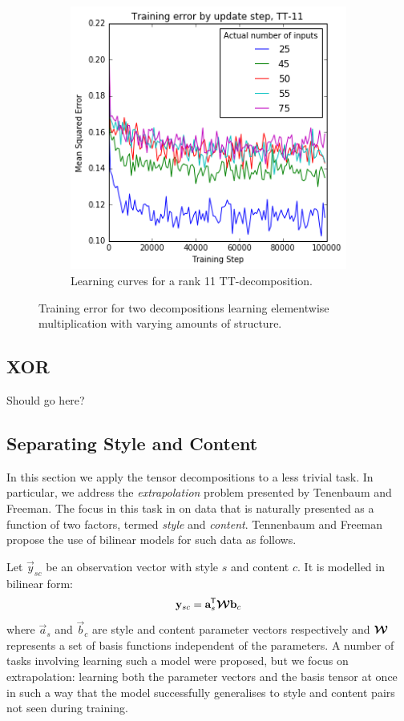 {\begin{figure}
\begin{subfigure}[t]{0.45\textwidth}
		\includegraphics[width=\textwidth]{tensors/correlatett11-mom}
		\caption{Learning curves for a rank 11 TT-decomposition.}
	\end{subfigure}
	\caption{Training error for two decompositions learning elementwise multiplication with
	 varying amounts of structure.}
	\label{fig:correlate-multiply}
\end{figure}

\subsection{XOR}
Should go here?

\subsection{Separating Style and Content}
In this section we apply the tensor decompositions to a less trivial task. In particular, we
address the \textit{extrapolation} problem presented by Tenenbaum and 
Freeman. \autocite{Tenenbaum2000} The focus in this task in on data that is naturally presented as a
function of two factors, termed \textit{style} and \textit{content}. Tennenbaum and Freeman
propose the use of bilinear models for such data as follows.

Let \(\vec{y}_{sc}\) be an observation vector with style \(s\) and content \(c\). It is modelled
in bilinear form:
\begin{equation}
	\mathbf{y}_{sc} = \mathbf{a}_s^{\mkern-1.5mu\mathsf{T}}\bm{\mathcal{W}}\mathbf{b}_c
\end{equation} where \(\vec{a}_s\) and \(\vec{b}_c\) are style and content parameter vectors
respectively and \(\bm{\mathcal{W}}\) represents a set of basis functions independent of the parameters.
A number of tasks involving learning such a model were proposed, but we focus on extrapolation:
 learning both the parameter vectors and the basis tensor at once in such a way that
the model successfully generalises to style and content pairs not seen during training.

}
